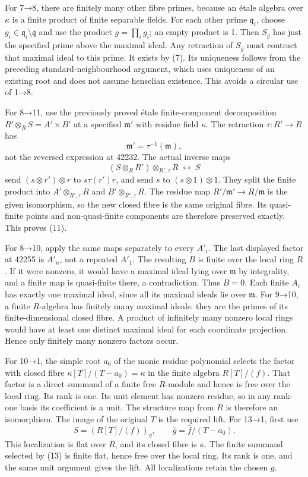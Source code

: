 For 7→8, there are finitely many other fibre primes, because an étale algebra over \(\kappa\) is a finite product of finite separable fields. For each other prime \(\mathfrak q_i\), choose \(g_i\in\mathfrak q_i\setminus\mathfrak q\) and use the product \(g=\prod_i g_i\); an empty product is 1. Then \(S_g\) has just the specified prime above the maximal ideal. Any retraction of \(S_g\) must contract that maximal ideal to this prime. It exists by (7). Its uniqueness follows from the preceding standard-neighbourhood argument, which uses uniqueness of an existing root and does not assume henselian existence. This avoids a circular use of 1→8.

For 8→11, use the previously proved étale finite-component decomposition \(R'\otimes_RS=A'\times B'\) at a specified \(\mathfrak m'\) with residue field \(\kappa\). The retraction \(\tau:R'\to R\) has \[
\mathfrak m'=\tau^{-1}(\mathfrak m),
\] not the reversed expression at 42232. The actual inverse maps \[
(S\otimes_RR')\otimes_{R',\tau}R\ \longleftrightarrow\ S
\] send \((s\otimes r')\otimes r\) to \(s\tau(r')r\), and send \(s\) to \((s\otimes1)\otimes1\). They split the finite product into \(A'\otimes_{R',\tau}R\) and \(B'\otimes_{R',\tau}R\). The residue map \(R'/\mathfrak m'\to R/\mathfrak m\) is the given isomorphism, so the new closed fibre is the same original fibre. Its quasi-finite points and non-quasi-finite components are therefore preserved exactly. This proves (11).

For 8→10, apply the same maps separately to every \(A'_i\). The last displayed factor at 42255 is \(A'_n\), not a repeated \(A'_1\). The resulting \(B\) is finite over the local ring \(R\). If it were nonzero, it would have a maximal ideal lying over \(\mathfrak m\) by integrality, and a finite map is quasi-finite there, a contradiction. Thus \(B=0\). Each finite \(A_i\) has exactly one maximal ideal, since all its maximal ideals lie over \(\mathfrak m\). For 9→10, a finite \(R\)-algebra has finitely many maximal ideals: they are the primes of its finite-dimensional closed fibre. A product of infinitely many nonzero local rings would have at least one distinct maximal ideal for each coordinate projection. Hence only finitely many nonzero factors occur.

For 10→1, the simple root \(a_0\) of the monic residue polynomial selects the factor with closed fibre \(\kappa[T]/(T-a_0)=\kappa\) in the finite algebra \(R[T]/(f)\). That factor is a direct summand of a finite free \(R\)-module and hence is free over the local ring. Its rank is one. Its unit element has nonzero residue, so in any rank-one basis its coefficient is a unit. The structure map from \(R\) is therefore an isomorphism. The image of the original \(T\) is the required lift. For 13→1, first use \[
S=(R[T]/(f))_g,\qquad \bar g=\bar f/(T-a_0).
\] This localization is flat over \(R\), and its closed fibre is \(\kappa\). The finite summand selected by (13) is finite flat, hence free over the local ring. Its rank is one, and the same unit argument gives the lift. All localizations retain the chosen \(g\).


